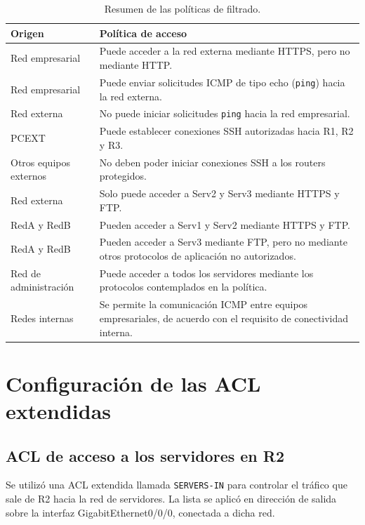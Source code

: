 \documentclass[12pt,a4paper]{article}
\begin{document}
\begin{table}[H]
\centering
\small
\begin{tabular}{|p{3.1cm}|p{8.8cm}|}
\hline
\textbf{Origen} & \textbf{Política de acceso} \\
\hline
Red empresarial & Puede acceder a la red externa mediante HTTPS,
pero no mediante HTTP. \\
\hline
Red empresarial & Puede enviar solicitudes ICMP de tipo echo
(\texttt{ping}) hacia la red externa. \\
\hline
Red externa & No puede iniciar solicitudes \texttt{ping} hacia
la red empresarial. \\
\hline
PCEXT & Puede establecer conexiones SSH autorizadas hacia R1,
R2 y R3. \\
\hline
Otros equipos externos & No deben poder iniciar conexiones SSH
a los routers protegidos. \\
\hline
Red externa & Solo puede acceder a Serv2 y Serv3 mediante HTTPS
y FTP. \\
\hline
RedA y RedB & Pueden acceder a Serv1 y Serv2 mediante HTTPS y FTP. \\
\hline
RedA y RedB & Pueden acceder a Serv3 mediante FTP, pero no mediante
otros protocolos de aplicación no autorizados. \\
\hline
Red de administración & Puede acceder a todos los servidores mediante
los protocolos contemplados en la política. \\
\hline
Redes internas & Se permite la comunicación ICMP entre equipos
empresariales, de acuerdo con el requisito de conectividad interna. \\
\hline
\end{tabular}
\caption{Resumen de las políticas de filtrado.}
\end{table}

\section{Configuración de las ACL extendidas}

\subsection{ACL de acceso a los servidores en R2}

Se utilizó una ACL extendida llamada \texttt{SERVERS-IN} para
controlar el tráfico que sale de R2 hacia la red de servidores.
La lista se aplicó en dirección de salida sobre la interfaz
GigabitEthernet0/0/0, conectada a dicha red.
\end{document}
